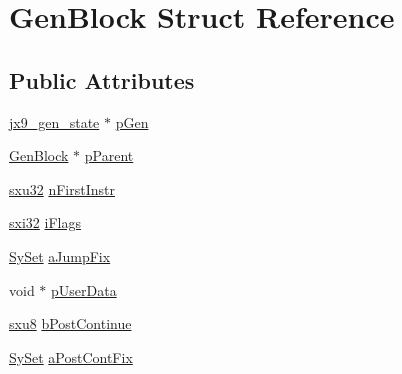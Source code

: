 \hypertarget{struct_gen_block}{\section{Gen\-Block Struct Reference}
\label{da/d01/struct_gen_block}
}
\subsection*{Public Attributes}
\begin{DoxyCompactItemize}
\item 
\hyperlink{structjx9__gen__state}{jx9\-\_\-gen\-\_\-state} $\ast$ \hyperlink{struct_gen_block_a0a850a1e68d92ad1745b8e8a0ca9412b}{p\-Gen}
\item 
\hyperlink{struct_gen_block}{Gen\-Block} $\ast$ \hyperlink{struct_gen_block_a4c5dd80b313b0d29386b1e7d87a72853}{p\-Parent}
\item 
\hyperlink{unqlite_8c_abc5a8a3f345c200c98c485551f49666e}{sxu32} \hyperlink{struct_gen_block_a8c80cb115b5914ece2eedeedb4994144}{n\-First\-Instr}
\item 
\hyperlink{unqlite_8c_a5a58035d4ae379178e2ca46cc3272fc5}{sxi32} \hyperlink{struct_gen_block_a275fd915b855bbff74e4811feb404214}{i\-Flags}
\item 
\hyperlink{struct_sy_set}{Sy\-Set} \hyperlink{struct_gen_block_af17601d1b8140367ea7cfb14e8e8d938}{a\-Jump\-Fix}
\item 
void $\ast$ \hyperlink{struct_gen_block_a60ea12e5d65e456b00fe799be048eb0a}{p\-User\-Data}
\item 
\hyperlink{unqlite_8c_ad603950fcd99613e8ef4887422cde7a0}{sxu8} \hyperlink{struct_gen_block_a5c4254aee323ba09ae76b2ad65bbccfc}{b\-Post\-Continue}
\item 
\hyperlink{struct_sy_set}{Sy\-Set} \hyperlink{struct_gen_block_ac600045592d2216dd48e0a846f460f8e}{a\-Post\-Cont\-Fix}
\end{DoxyCompactItemize}


